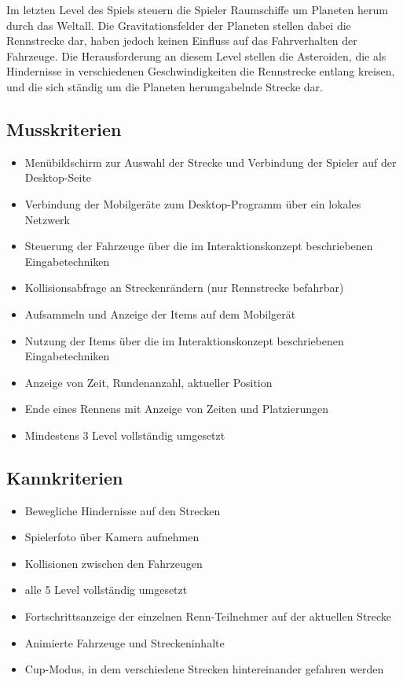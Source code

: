 Im letzten Level des Spiels steuern die Spieler Raumschiffe um Planeten herum durch das Weltall. Die Gravitationsfelder der Planeten stellen dabei die Rennstrecke dar, haben jedoch keinen Einfluss auf das Fahrverhalten der Fahrzeuge. Die Herausforderung an diesem Level stellen die Asteroiden, die als Hindernisse in verschiedenen Geschwindigkeiten die Rennstrecke entlang kreisen, und die sich ständig um die Planeten herumgabelnde Strecke dar.

\subsection{Musskriterien}

\begin{itemize}
\item Menübildschirm zur Auswahl der Strecke und Verbindung der Spieler auf der Desktop-Seite
\item Verbindung der Mobilgeräte zum Desktop-Programm über ein lokales Netzwerk
\item Steuerung der Fahrzeuge über die im Interaktionskonzept beschriebenen Eingabetechniken
\item Kollisionsabfrage an Streckenrändern (nur Rennstrecke befahrbar)
\item Aufsammeln und Anzeige der Items auf dem Mobilgerät
\item Nutzung der Items über die im Interaktionskonzept beschriebenen Eingabetechniken
\item Anzeige von Zeit, Rundenanzahl, aktueller Position
\item Ende eines Rennens mit Anzeige von Zeiten und Platzierungen
\item Mindestens 3 Level vollständig umgesetzt
\end{itemize}

\subsection{Kannkriterien}

\begin{itemize}
\item Bewegliche Hindernisse auf den Strecken
\item Spielerfoto über Kamera aufnehmen
\item Kollisionen zwischen den Fahrzeugen
\item alle 5 Level vollständig umgesetzt
\item Fortschrittsanzeige der einzelnen Renn-Teilnehmer auf der aktuellen Strecke
\item Animierte Fahrzeuge und Streckeninhalte
\item Cup-Modus, in dem verschiedene Strecken hintereinander gefahren werden
\end{itemize}

\newpage
